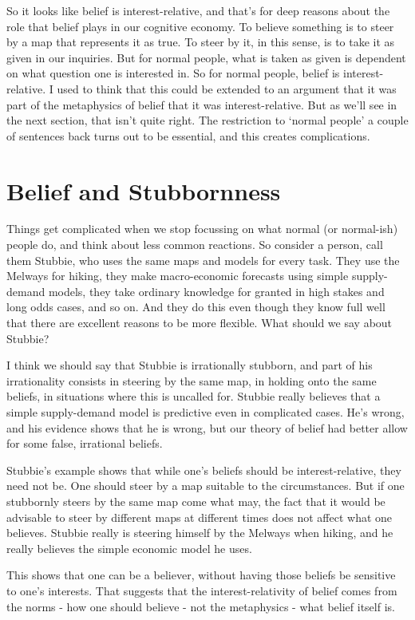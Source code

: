 \documentclass[
  12pt,
  letterpaper,
]{scrbook}
\begin{document}
So it looks like belief is interest-relative, and that's for deep
reasons about the role that belief plays in our cognitive economy. To
believe something is to steer by a map that represents it as true. To
steer by it, in this sense, is to take it as given in our inquiries. But
for normal people, what is taken as given is dependent on what question
one is interested in. So for normal people, belief is interest-relative.
I used to think that this could be extended to an argument that it was
part of the metaphysics of belief that it was interest-relative. But as
we'll see in the next section, that isn't quite right. The restriction
to `normal people' a couple of sentences back turns out to be essential,
and this creates complications.

\section{Belief and Stubbornness}\label{sec-stubbie}

Things get complicated when we stop focussing on what normal (or
normal-ish) people do, and think about less common reactions. So
consider a person, call them Stubbie, who uses the same maps and models
for every task. They use the Melways for hiking, they make
macro-economic forecasts using simple supply-demand models, they take
ordinary knowledge for granted in high stakes and long odds cases, and
so on. And they do this even though they know full well that there are
excellent reasons to be more flexible. What should we say about Stubbie?

I think we should say that Stubbie is irrationally stubborn, and part of
his irrationality consists in steering by the same map, in holding onto
the same beliefs, in situations where this is uncalled for. Stubbie
really believes that a simple supply-demand model is predictive even in
complicated cases. He's wrong, and his evidence shows that he is wrong,
but our theory of belief had better allow for some false, irrational
beliefs.

Stubbie's example shows that while one's beliefs should be
interest-relative, they need not be. One should steer by a map suitable
to the circumstances. But if one stubbornly steers by the same map come
what may, the fact that it would be advisable to steer by different maps
at different times does not affect what one believes. Stubbie really is
steering himself by the Melways when hiking, and he really believes the
simple economic model he uses.

This shows that one can be a believer, without having those beliefs be
sensitive to one's interests. That suggests that the interest-relativity
of belief comes from the norms - how one should believe - not the
metaphysics - what belief itself is.
\end{document}
